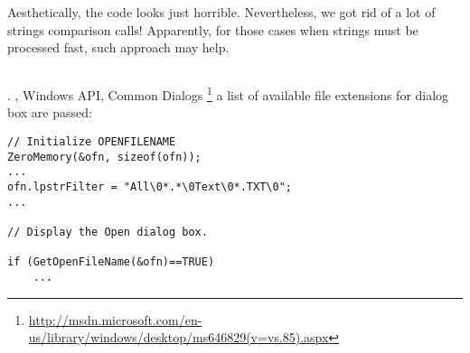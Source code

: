 {Aesthetically, the code looks just horrible}.
{Nevertheless, we got rid of a lot of strings comparison calls}! 
{Apparently, for those cases when strings must be processed fast, such approach may help}.





\subsection{}

.
, \InENRU Windows API,  Common Dialogs
\footnote{\url{http://msdn.microsoft.com/en-us/library/windows/desktop/ms646829(v=vs.85).aspx}} 
{a list of available file extensions for dialog box are passed}:

\begin{lstlisting}
// Initialize OPENFILENAME
ZeroMemory(&ofn, sizeof(ofn));
...
ofn.lpstrFilter = "All\0*.*\0Text\0*.TXT\0";
...

// Display the Open dialog box. 

if (GetOpenFileName(&ofn)==TRUE) 
	...
\end{lstlisting}

